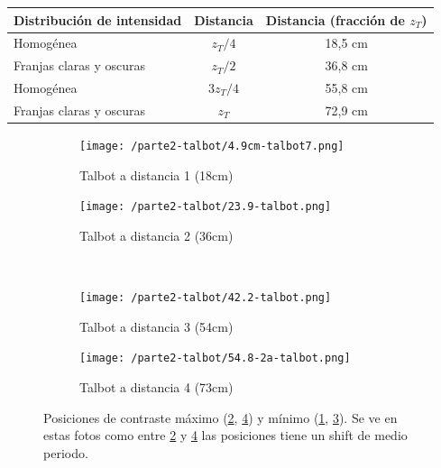 \documentclass{./packages/optica-article}
\begin{document}
\begin{center}
	\begin{tabular}{|l|c|c|} \hline
		Distribución de intensidad & Distancia & Distancia (fracción de $z_T$) \\ \hline
		Homogénea                  & $z_T/4$   & 18,5 cm                       \\
		Franjas claras y oscuras   & $z_T/2$   & 36,8 cm                       \\
		Homogénea                  & $3z_T/4$  & 55,8 cm                       \\
		Franjas claras y oscuras   & $z_T$     & 72,9 cm                       \\\hline
	\end{tabular}
	\label{tab:talbot}
\end{center}

\begin{figure}[hptb]
	\begin{center}
		\begin{subfigure}[t]{0.45\textwidth}\centering
			\texttt{[image: /parte2-talbot/4.9cm-talbot7.png]}
			\caption{ Talbot a distancia 1 (18cm)}
			\label{fig:talbot1}
		\end{subfigure}
		\quad
		\begin{subfigure}[t]{0.45\textwidth}\centering
			\texttt{[image: /parte2-talbot/23.9-talbot.png]}
			\caption{Talbot a distancia 2 (36cm)}
			\label{fig:talbot2}
		\end{subfigure}
		\\
		\begin{subfigure}[t]{0.45\textwidth}\centering
			\texttt{[image: /parte2-talbot/42.2-talbot.png]}
			\caption{ Talbot a distancia 3 (54cm)}
			\label{fig:talbot3}
		\end{subfigure}
		\quad
		\begin{subfigure}[t]{0.45\textwidth}\centering
			\texttt{[image: /parte2-talbot/54.8-2a-talbot.png]}
			\caption{ Talbot a distancia 4 (73cm)}
			\label{fig:talbot4}
		\end{subfigure}

		\caption{Posiciones de contraste máximo (\ref{fig:talbot2}, \ref{fig:talbot4}) y mínimo (\ref{fig:talbot1}, \ref{fig:talbot3}).
			Se ve en estas fotos como entre \ref{fig:talbot2} y \ref{fig:talbot4} las posiciones tiene un shift de medio periodo.}
		\label{fig:alltalbot}
	\end{center}
\end{figure}
\end{document}
